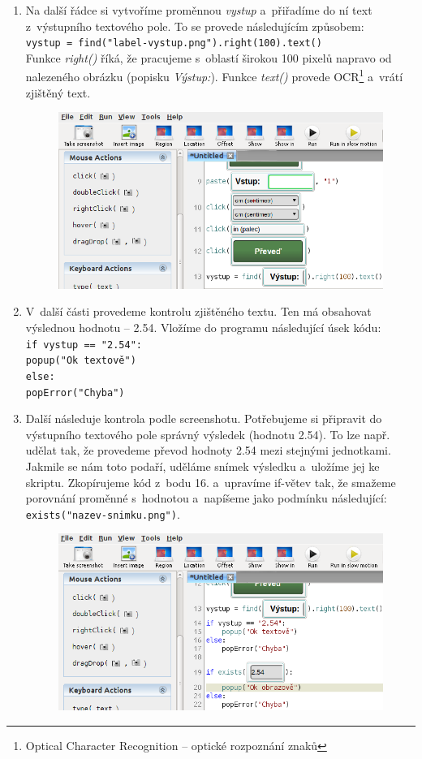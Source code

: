 \begin{enumerate}
				\item Na další řádce si vytvoříme proměnnou \emph{vystup} a~přiřadíme do ní text z~výstupního textového pole. To se provede následujícím způsobem:\\\texttt{vystup = find("label-vystup.png").right(100).text()}\\
				Funkce \emph{right()} říká, že pracujeme s~oblastí širokou 100 pixelů napravo od nalezeného obrázku (popisku \emph{Výstup:}). Funkce \emph{text()} provede OCR\footnote{Optical Character Recognition -- optické rozpoznání znaků} a~vrátí zjištěný text.
					\begin{figure}[ht!]
						\centering
						\includegraphics[width=12.5cm]{img/PrvniSkript/krok13.png}
					\end{figure}
					\FloatBarrier
				\item V~další části provedeme kontrolu zjištěného textu. Ten má obsahovat výslednou hodnotu -- 2.54. Vložíme do programu následující úsek kódu:\\\texttt{if vystup == "2.54":
					\\{\setlength{\parindent}{1cm}\indent popup("Ok textově")}
				\\else:
					\\{\setlength{\parindent}{1cm}\indent popError("Chyba")}}
				\item Další následuje  kontrola podle screenshotu. Potřebujeme si připravit do výstupního textového pole správný výsledek (hodnotu 2.54). To lze např. udělat tak, že provedeme převod hodnoty 2.54 mezi stejnými jednotkami. Jakmile se nám toto podaří, uděláme snímek výsledku a~uložíme jej ke skriptu. Zkopírujeme kód z~bodu 16. a~upravíme if-větev tak, že smažeme porovnání proměnné s~hodnotou a~napíšeme jako podmínku následující: \texttt{exists("nazev-snimku.png")}.
					\begin{figure}[ht!]
						\centering
						\includegraphics[width=12.5cm]{img/PrvniSkript/krok15.png}

\end{figure}
\end{enumerate}
